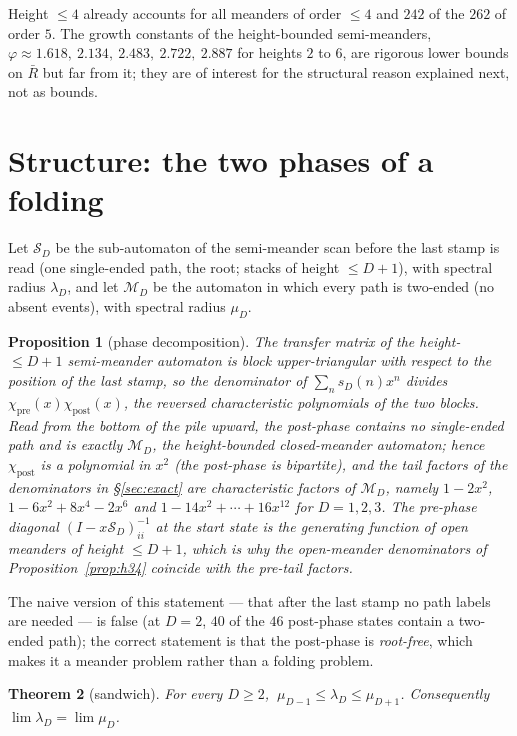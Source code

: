\documentclass[11pt]{amsart}
\newtheorem{theorem}{Theorem}[section]
\newtheorem{proposition}[theorem]{Proposition}
\theoremstyle{definition}
\newcommand{\Rb}{\bar R}
\newcommand{\Mm}{\mathcal M}
\newcommand{\Ss}{\mathcal S}
\begin{document}
Height $\le4$ already accounts for all meanders of order $\le4$ and $242$ of the $262$ of order $5$. The growth constants of the height-bounded semi-meanders, $\varphi\approx1.618,\ 2.134,\ 2.483,\ 2.722,\ 2.887$ for heights $2$ to $6$, are rigorous lower bounds on $\Rb$ but far from it; they are of interest for the structural reason explained next, not as bounds.

\section{Structure: the two phases of a folding}\label{sec:structure}

Let $\Ss_D$ be the sub-automaton of the semi-meander scan before the last stamp is read (one single-ended path, the root; stacks of height $\le D+1$), with spectral radius $\lambda_D$, and let $\Mm_D$ be the automaton in which every path is two-ended (no absent events), with spectral radius $\mu_D$.

\begin{proposition}[phase decomposition]\label{prop:phase}
The transfer matrix of the height-$\le D{+}1$ semi-meander automaton is block upper-triangular with respect to the position of the last stamp, so the denominator of $\sum_ns_D(n)x^n$ divides $\chi_{\mathrm{pre}}(x)\chi_{\mathrm{post}}(x)$, the reversed characteristic polynomials of the two blocks. Read from the bottom of the pile upward, the post-phase contains no single-ended path and is exactly $\Mm_D$, the height-bounded closed-meander automaton; hence $\chi_{\mathrm{post}}$ is a polynomial in $x^2$ (the post-phase is bipartite), and the tail factors of the denominators in \S\ref{sec:exact} are characteristic factors of $\Mm_D$, namely $1-2x^2$, $1-6x^2+8x^4-2x^6$ and $1-14x^2+\cdots+16x^{12}$ for $D=1,2,3$. The pre-phase diagonal $(I-x\Ss_D)^{-1}_{ii}$ at the start state is the generating function of open meanders of height $\le D+1$, which is why the open-meander denominators of Proposition~\ref{prop:h34} coincide with the pre-tail factors.
\end{proposition}

The naive version of this statement --- that after the last stamp no path labels are needed --- is false (at $D=2$, $40$ of the $46$ post-phase states contain a two-ended path); the correct statement is that the post-phase is \emph{root-free}, which makes it a meander problem rather than a folding problem.

\begin{theorem}[sandwich]\label{thm:sandwich}
For every $D\ge2$, $\ \mu_{D-1}\le\lambda_D\le\mu_{D+1}$. Consequently $\lim\lambda_D=\lim\mu_D$.
\end{theorem}
\end{document}
